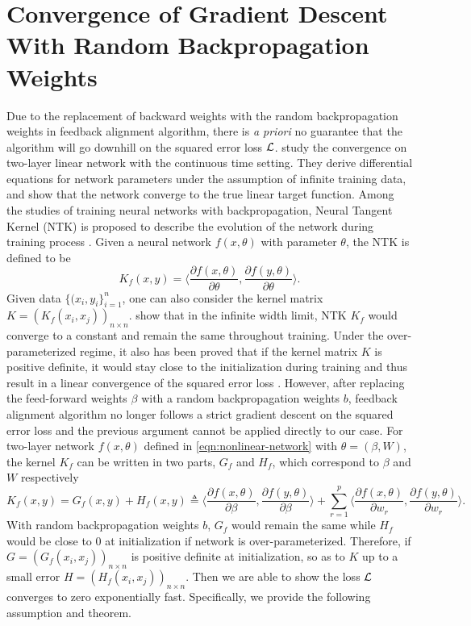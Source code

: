 
\section{Convergence of Gradient Descent With Random Backpropagation Weights}

Due to the replacement of backward weights with the random backpropagation weights in feedback alignment algorithm, there is \emph{a priori} no guarantee that the algorithm will go downhill on the squared error loss $\mathcal{L}$. \citet{lillicrap2020backpropagation} study the convergence on two-layer linear network with the continuous time setting. They derive differential equations for network parameters under the assumption of infinite training data, and show that the network converge to the true linear target function.
Among the studies of training neural networks with backpropagation, Neural Tangent Kernel (NTK) is proposed to describe the evolution of the network during training process \citep{jacot2018neural}. Given a neural network $f(x,\theta)$ with parameter $\theta$, the NTK is defined to be
\begin{equation}
	K_f(x,y) = \Big\langle \frac{\partial f (x,\theta)}{\partial \theta},\frac{\partial f (y,\theta)}{\partial \theta}\Big\rangle.
\end{equation}
Given data $\{(x_i,y_i\}_{i=1}^n$, one can also consider the kernel matrix $K = (K_f(x_i,x_j))_{n\times n}$. \citet{jacot2018neural} show that in the infinite width limit, NTK $K_f$ would converge to a constant and remain the same throughout training. Under the over-parameterized regime, it also has been proved that if the kernel matrix $K$ is positive definite, it would stay close to the initialization during training and thus result in a linear convergence of the squared error loss \citep{du2018gradient,du2019gradient,gao2020model}.
However, after replacing the feed-forward weights $\beta$ with a random backpropagation weights $b$, feedback alignment algorithm no longer follows a strict gradient descent on the squared error loss and the previous argument cannot be applied directly to our case. For two-layer network $f(x, \theta)$ defined in \eqref{eqn:nonlinear-network} with $\theta = (\beta,W)$, the kernel $K_f$ can be written in two parts, $G_f$ and $H_f$, which correspond to $\beta$ and $W$ respectively
\begin{equation}
K_f(x,y) = G_f(x, y) + H_f(x,y) \triangleq \Big\langle \frac{\partial f (x,\theta)}{\partial \beta},\frac{\partial f (y,\theta)}{\partial \beta}\Big\rangle + \sum_{r=1}^p\Big\langle \frac{\partial f (x,\theta)}{\partial w_r},\frac{\partial f (y,\theta)}{\partial w_r}\Big\rangle.
\end{equation}
With random backpropagation weights $b$, $G_f$ would remain the same while $H_f$ would be close to 0 at initialization if network is over-parameterized. Therefore, if $G = (G_f(x_i,x_j))_{n\times n}$ is positive definite at initialization, so as to $K$ up to a small error $H = (H_f(x_i,x_j))_{n\times n}$. Then we are able to show the loss $\mathcal{L}$ converges to zero exponentially fast. Specifically, we provide the following assumption and theorem.

